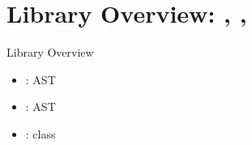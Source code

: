\section{Library Overview: , , }

\begin{frame}{Library Overview}
  \begin{itemize}
  \item {}:  AST
  \item {}:  AST
  \item {}:  class
  \end{itemize}
\end{frame}





